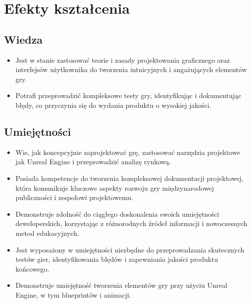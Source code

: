 \documentclass[12pt, a4paper]{article}
\begin{document}
\section{Efekty kształcenia}

\subsection*{Wiedza}
\begin{itemize}
  \item Jest w stanie zastosować teorie i zasady projektowania graficznego oraz interfejsów użytkownika do tworzenia intuicyjnych i angażujących elementów gry.
  \item Potrafi przeprowadzić kompleksowe testy gry, identyfikując i dokumentując błędy, co przyczynia się do wydania produktu o wysokiej jakości.
\end{itemize}

\subsection*{Umiejętności}
\begin{itemize}
  \item Wie, jak koncepcyjnie zaprojektować grę, zastosować narzędzia projektowe jak Unreal Engine i przeprowadzić analizę rynkową.
  \item Posiada kompetencje do tworzenia kompleksowej dokumentacji projektowej, która komunikuje kluczowe aspekty rozwoju gry międzynarodowej publiczności i zespołowi projektowemu.
  \item Demonstruje zdolność do ciągłego doskonalenia swoich umiejętności deweloperskich, korzystając z różnorodnych źródeł informacji i nowoczesnych metod edukacyjnych.
  \item Jest wyposażony w umiejętności niezbędne do przeprowadzania skutecznych testów gier, identyfikowania błędów i zapewniania jakości produktu końcowego.
  \item Demonstruje umiejętność tworzenia elementów gry przy użyciu Unreal Engine, w tym blueprintów i animacji.
\end{itemize}
\end{document}
